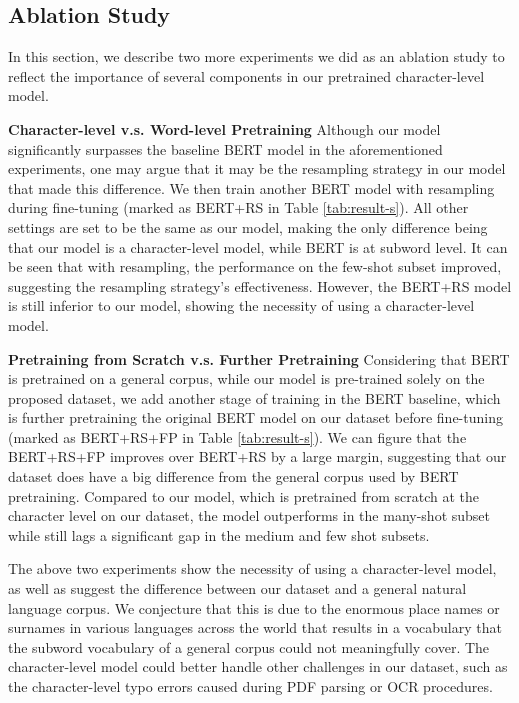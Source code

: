 \documentclass{article}
\begin{document}
\subsection{Ablation Study}
In this section, we describe two more experiments we did as an ablation study to reflect the importance of several components in our pretrained character-level model. 

\textbf{Character-level v.s. Word-level Pretraining}
Although our model significantly surpasses the baseline BERT model in the aforementioned experiments, one may argue that it may be the resampling strategy in our model that made this difference. We then train another BERT model with resampling during fine-tuning (marked as BERT+RS in Table \ref{tab:result-s}). All other settings are set to be the same as our model, making the only difference being that our model is a character-level model, while BERT is at subword level. It can be seen that with resampling, the performance on the few-shot subset improved, suggesting the resampling strategy's effectiveness. However, the BERT+RS model is still inferior to our model, showing the necessity of using a character-level model. 




\textbf{Pretraining from Scratch v.s. Further Pretraining}
Considering that BERT is pretrained on a general corpus, while our model is pre-trained solely on the proposed dataset, we add another stage of training in the BERT baseline, which is further pretraining the original BERT model on our dataset before fine-tuning (marked as BERT+RS+FP in Table \ref{tab:result-s}). We can figure that the BERT+RS+FP improves over BERT+RS by a large margin, suggesting that our dataset does have a big difference from the general corpus used by BERT pretraining. Compared to our model, which is pretrained from scratch at the character level on our dataset, the model outperforms in the many-shot subset while still lags a significant gap in the medium and few shot subsets. 

The above two experiments show the necessity of using a character-level model, as well as suggest the difference between our dataset and a general natural language corpus. We conjecture that this is due to the enormous place names or surnames in various languages across the world that results in a vocabulary that the subword vocabulary of a general corpus could not meaningfully cover. The character-level model could better handle other challenges in our dataset, such as the character-level typo errors caused during PDF parsing or OCR procedures.
\end{document}
